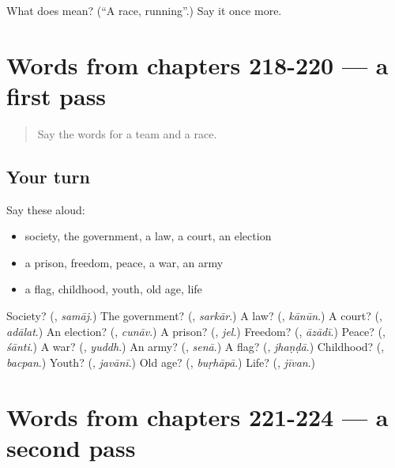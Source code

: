 \begin{tcolorbox}[breakable,colback=teal!4,colframe=teal!35!black,title={Before you move on}]
What does  mean? (\textquotedblleft{}A race, running\textquotedblright{}.) Say it once more.
\end{tcolorbox}
\section[(dialogue)]{Words from chapters 218-220 — a first pass}

\label{lesson:HI-R224-first-pass-words-from-chapters-218-220}



\begin{quote}
Say the words for a team and a race.
\end{quote}

\subsection*{Your turn}
Say these aloud:

\begin{itemize}
\raggedright
  \item society, the government, a law, a court, an election
  \item a prison, freedom, peace, a war, an army
  \item a flag, childhood, youth, old age, life
\end{itemize}

\begin{tcolorbox}[breakable,colback=teal!4,colframe=teal!35!black,title={Before you move on}]
Society? (\textbf{}, \emph{samāj}.) The government? (\textbf{}, \emph{sarkār}.) A law? (\textbf{}, \emph{kānūn}.) A court? (\textbf{}, \emph{adālat}.) An election? (\textbf{}, \emph{cunāv}.) A prison? (\textbf{}, \emph{jel}.) Freedom? (\textbf{}, \emph{āzādī}.) Peace? (\textbf{}, \emph{śānti}.) A war? (\textbf{}, \emph{yuddh}.) An army? (\textbf{}, \emph{senā}.) A flag? (\textbf{}, \emph{jhaṇḍā}.) Childhood? (\textbf{}, \emph{bacpan}.) Youth? (\textbf{}, \emph{javānī}.) Old age? (\textbf{}, \emph{buṛhāpā}.) Life? (\textbf{}, \emph{jīvan}.)
\end{tcolorbox}
\section[(dialogue)]{Words from chapters 221-224 — a second pass}

